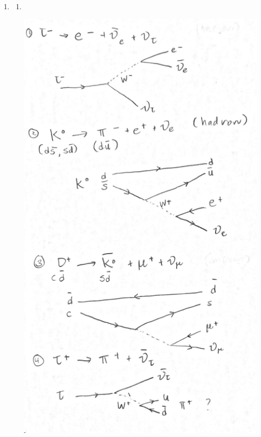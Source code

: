 \documentclass{homework}
\begin{document}
\begin{enumerate}
		\item \begin{enumerate}
			\item  ~~ \\ \begin{minipage}{0.5\textwidth}
				\includegraphics[width=\linewidth]{prob8a1}
			\end{minipage} \begin{minipage}{0.5\textwidth}

\end{minipage}
\end{enumerate}
\end{enumerate}
\end{document}
